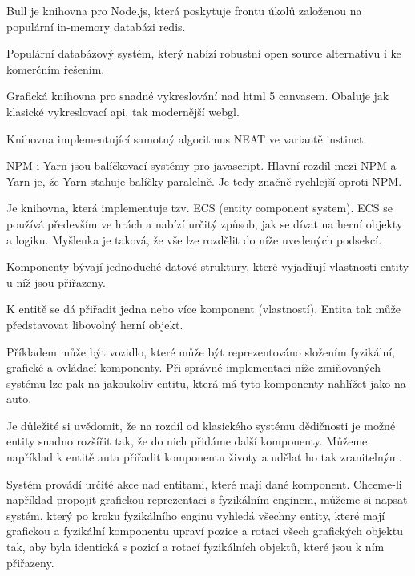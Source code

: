 Bull je knihovna pro Node.js, která poskytuje frontu úkolů založenou na populární in-memory databázi redis.

Populární databázový systém, který nabízí robustní open source alternativu i ke komerčním řešením.

Grafická knihovna pro snadné vykreslování nad html 5 canvasem. Obaluje jak klasické vykreslovací api, tak modernější webgl.

Knihovna implementující samotný algoritmus NEAT ve variantě instinct.

NPM i Yarn jsou balíčkovací systémy pro javascript. Hlavní rozdíl mezi NPM a Yarn je, že Yarn stahuje balíčky paralelně. Je tedy značně rychlejší oproti NPM. 

\label{sec:ces}
Je knihovna, která implementuje tzv. ECS (entity component system). ECS se používá především ve hrách a nabízí určitý způsob, jak se dívat na herní objekty a logiku. Myšlenka je taková, že vše lze rozdělit do níže uvedených podsekcí.

Komponenty bývají jednoduché datové struktury, které vyjadřují vlastnosti entity u níž jsou přiřazeny.

K entitě se dá přiřadit jedna nebo více komponent (vlastností). Entita tak může představovat libovolný herní objekt. 

Příkladem může být vozidlo, které může být reprezentováno složením fyzikální, grafické a ovládací komponenty. Při správné implementaci níže zmiňovaných systému lze pak na jakoukoliv entitu, která má tyto komponenty nahlížet jako na auto.

Je důležité si uvědomit, že na rozdíl od klasického systému dědičnosti je možné entity snadno rozšířit tak, že do nich přidáme další komponenty. Můžeme například k entitě auta přiřadit komponentu životy a udělat ho tak zranitelným.

Systém provádí určité akce nad entitami, které mají dané komponent. Chceme-li například propojit grafickou reprezentaci s fyzikálním enginem, můžeme si napsat systém, který po kroku fyzikálního enginu vyhledá všechny entity, které mají grafickou a fyzikální komponentu upraví pozice a rotaci všech grafických objektu tak, aby byla identická s pozicí a rotací fyzikálních objektů, které jsou k ním přiřazeny.



